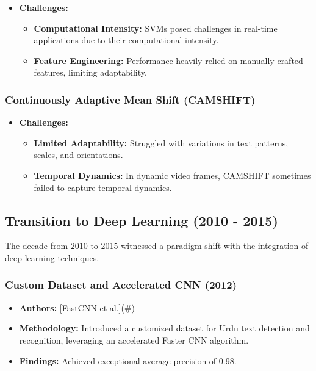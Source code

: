 \documentclass[default,iicol]{sn-jnl}%
\begin{document}
	\begin{itemize}
		\item \textbf{Challenges:}
		\begin{itemize}
			\item \textbf{Computational Intensity:} SVMs posed challenges in real-time applications due to their computational intensity.
			\item \textbf{Feature Engineering:} Performance heavily relied on manually crafted features, limiting adaptability.
		\end{itemize}
	\end{itemize}
	
	\subsubsection{Continuously Adaptive Mean Shift (CAMSHIFT)}
	
	\begin{itemize}
		\item \textbf{Challenges:}
		\begin{itemize}
			\item \textbf{Limited Adaptability:} Struggled with variations in text patterns, scales, and orientations.
			\item \textbf{Temporal Dynamics:} In dynamic video frames, CAMSHIFT sometimes failed to capture temporal dynamics.
		\end{itemize}
	\end{itemize}
	
	\subsection{Transition to Deep Learning (2010 - 2015)}
	
	The decade from 2010 to 2015 witnessed a paradigm shift with the integration of deep learning techniques.
	
	\subsubsection{Custom Dataset and Accelerated CNN (2012)}
	
	\begin{itemize}
		\item \textbf{Authors:} [FastCNN et al.](\#)
		\item \textbf{Methodology:} Introduced a customized dataset for Urdu text detection and recognition, leveraging an accelerated Faster CNN algorithm.
		\item \textbf{Findings:} Achieved exceptional average precision of 0.98.
	\end{itemize}
	
\end{document}
